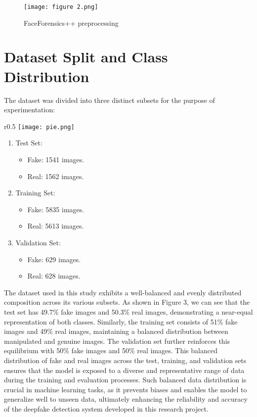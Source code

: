 \documentclass{article}
\begin{document}
\begin{figure}[h]
    \centering
    \texttt{[image: figure 2.png]}
    \caption{FaceForensics++ preprocessing}
    \label{fig:enter-label}
\end{figure}

\section{Dataset Split and Class Distribution}
The dataset was divided into three distinct subsets for the purpose of experimentation:



\begin{wrapfigure}{r}{0.5\textwidth}
    \centering
    \texttt{[image: pie.png]}

\end{wrapfigure}

\begin{enumerate}
    \item Test Set:
    \begin{itemize}
        \item Fake: 1541 images.
        \item Real: 1562 images.
    \end{itemize}
    \item Training Set:
    \begin{itemize}
        \item Fake: 5835 images.
        \item Real: 5613 images.
    \end{itemize}
    \item Validation Set:
    \begin{itemize}
        \item Fake: 629 images.
        \item Real: 628 images.
    \end{itemize}
\end{enumerate}

The dataset used in this study exhibits a well-balanced and evenly distributed composition across its various subsets. As shown in Figure 3, we can see that the test set has 49.7\% fake images and 50.3\% real images, demonstrating a near-equal representation of both classes. Similarly, the training set consists of 51\% fake images and 49\% real images, maintaining a balanced distribution between manipulated and genuine images. The validation set further reinforces this equilibrium with 50\% fake images and 50\% real images. This balanced distribution of fake and real images across the test, training, and validation sets ensures that the model is exposed to a diverse and representative range of data during the training and evaluation processes. Such balanced data distribution is crucial in machine learning tasks, as it prevents biases and enables the model to generalize well to unseen data, ultimately enhancing the reliability and accuracy of the deepfake detection system developed in this research project.
\end{document}
